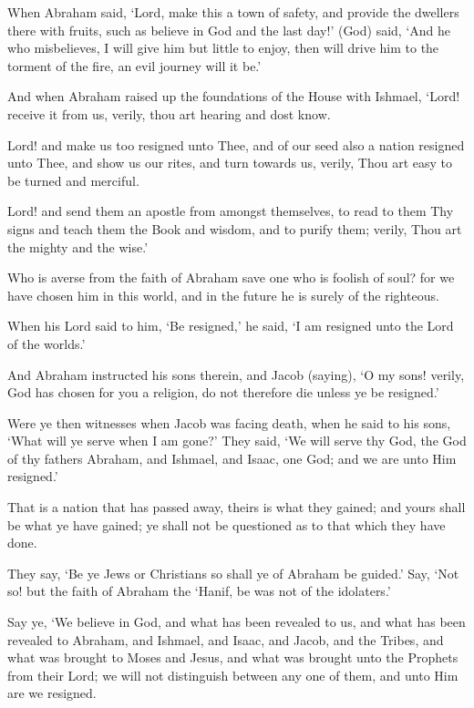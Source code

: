 \documentclass[fontsize=14pt, letterpaper, notitlepage, openany, DIV=12]{scrbook} %
\begin{document}
\noindent[2:126]
When Abraham said, `Lord, make this a town of safety, and provide the dwellers there
with fruits, such as believe in God and the last day!' (God) said, `And he who misbelieves, I will
give him but little to enjoy, then will drive him to the torment of the fire, an evil journey will it
be.'

\noindent[2:127]
And when Abraham raised up the foundations of the House with Ishmael, `Lord! receive
it from us, verily, thou art hearing and dost know.

\noindent[2:128]
Lord! and make us too resigned unto Thee, and of our seed also a nation resigned unto
Thee, and show us our rites, and turn towards us, verily, Thou art easy to be turned and merciful.

\noindent[2:129]
Lord! and send them an apostle from amongst themselves, to read to them Thy signs and
teach them the Book and wisdom, and to purify them; verily, Thou art the mighty and the wise.'

\noindent[2:130]
Who is averse from the faith of Abraham save one who is foolish of soul? for we have
chosen him in this world, and in the future he is surely of the righteous.

\noindent[2:131]
When his Lord said to him, `Be resigned,' he said, `I am resigned unto the Lord of the
worlds.'

\noindent[2:132]
And Abraham instructed his sons therein, and Jacob (saying), `O my sons! verily, God
has chosen for you a religion, do not therefore die unless ye be resigned.'

\noindent[2:133]
Were ye then witnesses when Jacob was facing death, when he said to his sons, `What
will ye serve when I am gone?' They said, `We will serve thy God, the God of thy fathers
Abraham, and Ishmael, and Isaac, one God; and we are unto Him resigned.'

\noindent[2:134]
That is a nation that has passed away, theirs is what they gained; and yours shall be what
ye have gained; ye shall not be questioned as to that which they have done.

\noindent[2:135]
They say, `Be ye Jews or Christians so shall ye of Abraham be guided.' Say, `Not so! but
the faith of Abraham the `Hanif, be was not of the idolaters.'

\noindent[2:136]
Say ye, `We believe in God, and what has been revealed to us, and what has been
revealed to Abraham, and Ishmael, and Isaac, and Jacob, and the Tribes, and what was brought
to Moses and Jesus, and what was brought unto the Prophets from their Lord; we will not
distinguish between any one of them, and unto Him are we resigned.
\end{document}
